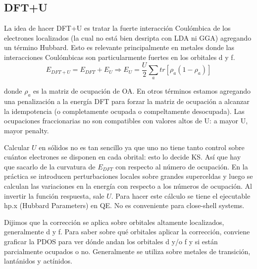\subsection{DFT+U}

  La idea de hacer DFT+U es tratar la fuerte interacción Coulómbica de los electrones localizados (la cual no está bien desripta con LDA ni GGA) agregando un término Hubbard. Esto es relevante principalmente en metales donde las interacciones Coulómbicas son particularmente fuertes en los orbitales d y f.
   $$E_{DFT+U} = E_{DFT} + E_{U} \Rightarrow E_{U} = \frac{U}{2} \sum_a tr\left[ \rho_a (1 - \rho_a)  \right]$$

  donde $\rho_a$ es la matriz de ocupación de OA. En otros términos estamos agregando una penalización a la energía DFT para forzar la matriz de ocupación a alcanzar la idempotencia (o completamente ocupada o compeltamente desocupada). Las ocupaciones fraccionarias no son compatibles con valores altos de U: a mayor U, mayor penalty.


  Calcular $U$ en sólidos no es tan sencillo ya que uno no tiene tanto control sobre cuántos electrones se disponen en cada obrital: esto lo decide KS. Así que hay que sacarlo de la curvatura de $E_{DFT}$ con respecto al número de ocupación. En la práctica se introducen perturbaciones locales sobre grandes superceldas y luego se calculan las variaciones en la energía con respecto a los números de ocupación. Al invertir la función respuesta, sale $U$. Para hacer este cálculo se tiene el ejecutable hp.x (Hubbard Parameters) en QE. No es conveniente para close-shell systems.

  Dijimos que la corrección se aplica sobre orbitales altamente localizados, generalmente d y f. Para saber sobre qué orbitales aplicar la corrección, conviene graficar la PDOS para ver dónde andan los orbitales d y/o f y si están parcialmente ocupados o no. Generalmente se utiliza sobre metales de transición, lantánidos y actínidos.


